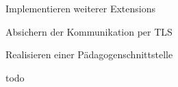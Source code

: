 \begin{frame}
\begin{block}{}
	Implementieren weiterer Extensions
\end{block}
\begin{block}{}
	Absichern der Kommunikation per TLS
\end{block}
\begin{block}{}
	Realisieren einer Pädagogenschnittstelle
\end{block}
\begin{block}{}
	todo
\end{block}
\end{frame}